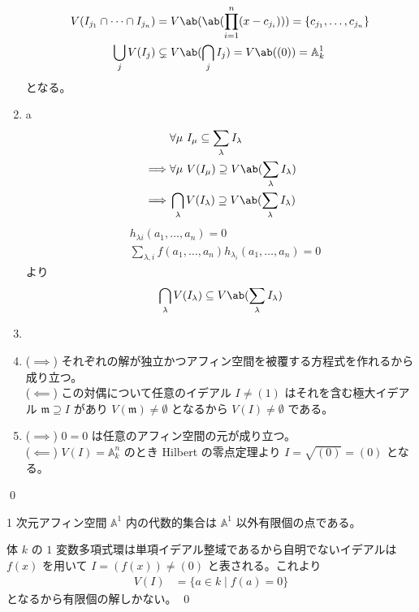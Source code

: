 \documentclass[uplatex,dvipdfmx,a4paper,11pt]{jlreq}
\makeatletter
\renewcommand{\AA}{\mathbb{A}}
\newcommand{\mm}{\mathfrak{m}}
\numberwithin{equation}{section}
\theoremstyle{definition}
\renewenvironment{proof}[1][\proofname]{\par
  \normalfont
  \topsep6\p@\@plus6\p@ \trivlist
  \item[\hskip\labelsep{\bfseries #1}\@addpunct{\bfseries}]\ignorespaces\quad\par
}{%
  \qed\endtrivlist\@endpefalse
}
\renewcommand\proofname{証明}
\makeatother
\begin{document}
\begin{proof}
\begin{enumerate}
\begin{align}
            V(I_{j_1}\cap \cdots\cap I_{j_n}) & = V\ab(\ab(\prod_{i=1}^{n}(x - c_{j_i}))) = \lbrace c_{j_1},\ldots,c_{j_n} \rbrace \\
            \bigcup_j V(I_j)                  & \subsetneq V\ab(\bigcap_j I_j) = V\ab((0)) = \AA_k^1
          \end{align}
          となる。
    \item a
          \begin{align}
                     & \forall\mu \ I_\mu \subseteq \sum_\lambda I_\lambda                 \\
            \implies & \forall\mu \ V(I_\mu) \supseteq V\ab(\sum_\lambda I_\lambda)        \\
            \implies & \bigcap_\lambda V(I_\lambda) \supseteq V\ab(\sum_\lambda I_\lambda)
          \end{align}
          \begin{align}
             & h_{\lambda i}(a_1,\ldots,a_n) = 0                                    \\
             & \sum_{\lambda, i} f(a_1,\ldots,a_n)h_{\lambda_i}(a_1,\ldots,a_n) = 0
          \end{align}
          より
          \begin{align}
            \bigcap_\lambda V(I_\lambda) \subseteq V\ab(\sum_\lambda I_\lambda)
          \end{align}
    \item
    \item ($\implies$) それぞれの解が独立かつアフィン空間を被覆する方程式を作れるから成り立つ。 \\
          ($\impliedby$) この対偶について任意のイデアル $I \neq (1)$ はそれを含む極大イデアル $\mm\supseteq I$ があり $V(\mm) \neq \emptyset$ となるから $V(I) \neq \emptyset$ である。
    \item ($\implies$) $0 = 0$ は任意のアフィン空間の元が成り立つ。 \\
          ($\impliedby$) $V(I) = \AA_k^n$ のとき Hilbert の零点定理より $I = \sqrt{(0)} = (0)$ となる。
  \end{enumerate}
\end{proof}

\begin{proposition}
  1 次元アフィン空間 $\AA^1$ 内の代数的集合は $\AA^1$ 以外有限個の点である。
\end{proposition}
\begin{proof}
  体 $k$ の $1$ 変数多項式環は単項イデアル整域であるから自明でないイデアルは $f(x)$ を用いて $I = (f(x)) \neq (0)$ と表される。これより
  \begin{align}
    V(I) & = \lbrace a\in k\mid f(a) = 0\rbrace
  \end{align}
  となるから有限個の解しかない。
\end{proof}
\end{document}
